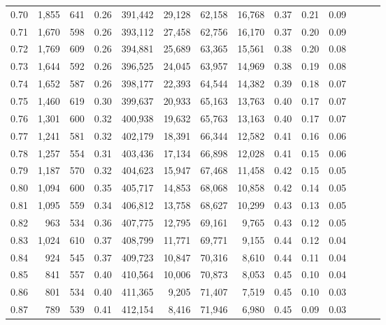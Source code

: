 \begin{tabular}{rrrrrrrrrrrrrr}
0.70 &   1,855 &    641 &  0.26 &  391,442 &   29,128 &  62,158 &  16,768 &  0.37 &  0.21 &      0.09 \\
0.71 &   1,670 &    598 &  0.26 &  393,112 &   27,458 &  62,756 &  16,170 &  0.37 &  0.20 &      0.09 \\
0.72 &   1,769 &    609 &  0.26 &  394,881 &   25,689 &  63,365 &  15,561 &  0.38 &  0.20 &      0.08 \\
0.73 &   1,644 &    592 &  0.26 &  396,525 &   24,045 &  63,957 &  14,969 &  0.38 &  0.19 &      0.08 \\
0.74 &   1,652 &    587 &  0.26 &  398,177 &   22,393 &  64,544 &  14,382 &  0.39 &  0.18 &      0.07 \\
0.75 &   1,460 &    619 &  0.30 &  399,637 &   20,933 &  65,163 &  13,763 &  0.40 &  0.17 &      0.07 \\
0.76 &   1,301 &    600 &  0.32 &  400,938 &   19,632 &  65,763 &  13,163 &  0.40 &  0.17 &      0.07 \\
0.77 &   1,241 &    581 &  0.32 &  402,179 &   18,391 &  66,344 &  12,582 &  0.41 &  0.16 &      0.06 \\
0.78 &   1,257 &    554 &  0.31 &  403,436 &   17,134 &  66,898 &  12,028 &  0.41 &  0.15 &      0.06 \\
0.79 &   1,187 &    570 &  0.32 &  404,623 &   15,947 &  67,468 &  11,458 &  0.42 &  0.15 &      0.05 \\
0.80 &   1,094 &    600 &  0.35 &  405,717 &   14,853 &  68,068 &  10,858 &  0.42 &  0.14 &      0.05 \\
0.81 &   1,095 &    559 &  0.34 &  406,812 &   13,758 &  68,627 &  10,299 &  0.43 &  0.13 &      0.05 \\
0.82 &     963 &    534 &  0.36 &  407,775 &   12,795 &  69,161 &   9,765 &  0.43 &  0.12 &      0.05 \\
0.83 &   1,024 &    610 &  0.37 &  408,799 &   11,771 &  69,771 &   9,155 &  0.44 &  0.12 &      0.04 \\
0.84 &     924 &    545 &  0.37 &  409,723 &   10,847 &  70,316 &   8,610 &  0.44 &  0.11 &      0.04 \\
0.85 &     841 &    557 &  0.40 &  410,564 &   10,006 &  70,873 &   8,053 &  0.45 &  0.10 &      0.04 \\
0.86 &     801 &    534 &  0.40 &  411,365 &    9,205 &  71,407 &   7,519 &  0.45 &  0.10 &      0.03 \\
0.87 &     789 &    539 &  0.41 &  412,154 &    8,416 &  71,946 &   6,980 &  0.45 &  0.09 &      0.03 \\

\end{tabular}
